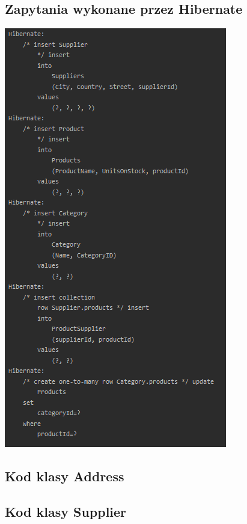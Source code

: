 \documentclass[a4paper, 11pt]{article}
\begin{document}
    \subsection{Zapytania wykonane przez Hibernate}
    \begin{center}
        \includegraphics[scale=1.3]{images/point11/hibernateQueries.png}
    \end{center}

    \subsection{Kod klasy Address}
    

    \subsection{Kod klasy Supplier}
    
\end{document}
